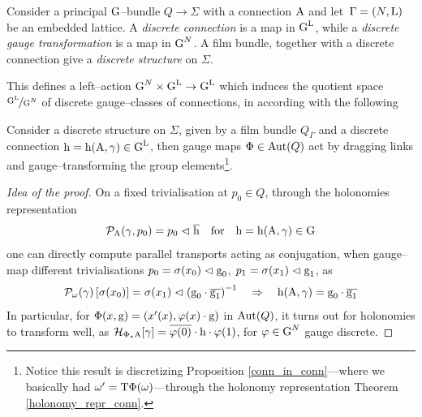 
\begin{defi}
    Consider a principal $\text{\normalfont G}$--bundle $Q\to\Sigma$ with a connection $\text{\normalfont A}$ and let \,$\Gamma=(N,\text{\normalfont L})$ be an embedded lattice. A \emph{discrete connection} is a map in $\text{\normalfont G}^{\text{\normalfont L}}$, while a \emph{discrete gauge transformation} is a map in $\text{\normalfont G}^N$. A film bundle, together with a discrete connection give a \emph{discrete structure} on $\Sigma$. 
\end{defi}

This defines a left--action $\text{\normalfont G}^N\times\text{\normalfont G}^{\text{\normalfont L}}\to\text{\normalfont G}^{\text{\normalfont L}}$ which induces the quotient space $\nicefrac{\text{\normalfont G}^{\text{\normalfont L}}}{\text{\normalfont G}^N}$ of discrete gauge--classes of connections, in according with the following

\begin{prop}
    Consider a discrete structure on $\Sigma$, given by a film bundle $Q_\Gamma$ and a discrete connection $\text{\normalfont h}=\text{\normalfont h}(\text{\normalfont A},\gamma)\in\text{\normalfont G}^{\text{\normalfont L}}$, then
    gauge maps $\Phi\in\text{\normalfont Aut}(Q)$ act by dragging links and gauge--transforming the group elements\footnote{Notice this result is discretizing Proposition \ref{conn_in_conn}---where we basically had $\omega'=\text{\normalfont T}\Phi(\omega)$---through the holonomy representation Theorem \ref{holonomy_repr_conn}.}.%
\end{prop}
\begin{proof}[Idea of the proof]
    On a fixed trivialisation at $p_0\in Q$, through the holonomies representation $$\mathcal{P}_{\text{\normalfont A}}(\gamma,p_0)=p_0\vartriangleleft\overline{\text{\normalfont h}}\quad\text{for}\quad\text{\normalfont h}=\text{\normalfont h}(\text{\normalfont A},\gamma)\in\text{\normalfont G}$$
    one can directly compute parallel transports acting as conjugation, when gauge--map different trivialisations $p_0=\sigma(x_0)\vartriangleleft\text{\normalfont g}_0$, $p_1=\sigma(x_1)\vartriangleleft\text{\normalfont g}_1$, as
    $$\mathcal{P}_\omega(\gamma)\left[\sigma(x_0)\right]=\sigma(x_1)\vartriangleleft\left(\text{\normalfont g}_0\cdot\overline{\text{\normalfont g}_1}\right)^{-1}\quad\Rightarrow\quad\text{\normalfont h}(\text{\normalfont A},\gamma)=\text{\normalfont g}_0\cdot\overline{\text{\normalfont g}_1}$$
    In particular, for $\Phi(x,\text{\normalfont g})=(x'(x),\varphi(x)\cdot\text{\normalfont g})$ in $\text{\normalfont Aut}(Q)$, it turns out for holonomies to transform well, as $\mathcal{H}_{\Phi_*\text{\normalfont A}}[\gamma]=\overline{\varphi(0)}\cdot\text{\normalfont h}\cdot\varphi(1)$, for $\varphi\in\text{\normalfont G}^N$ gauge discrete.
    
\end{proof}

